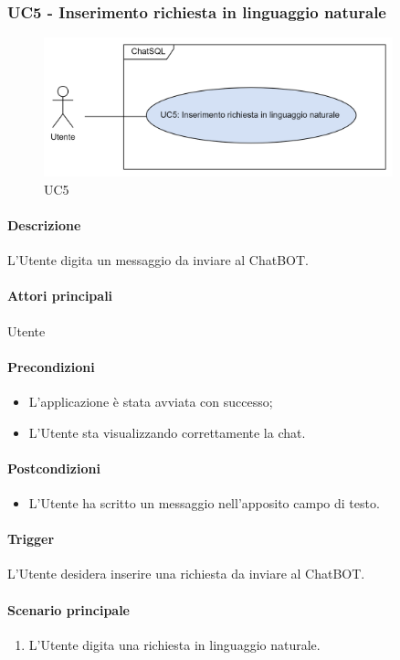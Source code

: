 \subsubsection{UC5 - Inserimento richiesta in linguaggio naturale}\label{UC5}

\begin{figure}[H]
  \centering
  \includegraphics[width=0.90\textwidth]{assets/uc5.png}
  \caption{UC5}
\end{figure}

\paragraph*{Descrizione}
L'Utente digita un messaggio da inviare al ChatBOT.

\paragraph*{Attori principali}
Utente

\paragraph*{Precondizioni}
\begin{itemize}
  \item L'applicazione è stata avviata con successo;
  \item L'Utente sta visualizzando correttamente la chat.
\end{itemize}

\paragraph*{Postcondizioni}
\begin{itemize}
  \item L'Utente ha scritto un messaggio nell'apposito campo di testo.
\end{itemize}

\paragraph*{Trigger}
L'Utente desidera inserire una richiesta da inviare al ChatBOT.

\paragraph*{Scenario principale}
\begin{enumerate}
  \item L'Utente digita una richiesta in linguaggio naturale.
\end{enumerate}
